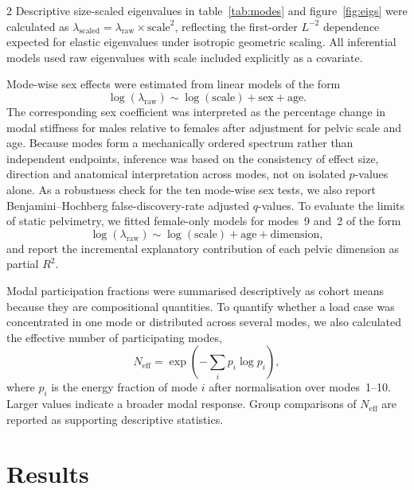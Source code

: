 \documentclass[openacc]{rsproca_new}
\begin{document}
\begin{multicols}{2}
Descriptive size-scaled eigenvalues in table~\ref{tab:modes} and figure~\ref{fig:eigs} were calculated as $\lambda_{\mathrm{scaled}}=\lambda_{\mathrm{raw}}\times \mathrm{scale}^{2}$, reflecting the first-order $L^{-2}$ dependence expected for elastic eigenvalues under isotropic geometric scaling. All inferential models used raw eigenvalues with scale included explicitly as a covariate.

Mode-wise sex effects were estimated from linear models of the form
\begin{equation}
\log(\lambda_{\mathrm{raw}}) \sim \log(\mathrm{scale}) + \mathrm{sex} + \mathrm{age}.
\end{equation}
The corresponding sex coefficient was interpreted as the percentage change in modal stiffness for males relative to females after adjustment for pelvic scale and age. Because modes form a mechanically ordered spectrum rather than independent endpoints, inference was based on the consistency of effect size, direction and anatomical interpretation across modes, not on isolated $p$-values alone. As a robustness check for the ten mode-wise sex tests, we also report Benjamini--Hochberg false-discovery-rate adjusted $q$-values. To evaluate the limits of static pelvimetry, we fitted female-only models for modes~9 and~2 of the form
\begin{equation}
\log(\lambda_{\mathrm{raw}}) \sim \log(\mathrm{scale}) + \mathrm{age} + \mathrm{dimension},
\end{equation}
and report the incremental explanatory contribution of each pelvic dimension as partial $R^2$.

Modal participation fractions were summarised descriptively as cohort means because they are compositional quantities. To quantify whether a load case was concentrated in one mode or distributed across several modes, we also calculated the effective number of participating modes,
\begin{equation}
N_{\mathrm{eff}} = \exp\left(-\sum_i p_i\log p_i\right),
\end{equation}
where $p_i$ is the energy fraction of mode $i$ after normalisation over modes~1--10. Larger values indicate a broader modal response. Group comparisons of $N_{\mathrm{eff}}$ are reported as supporting descriptive statistics.

\section{Results}

\end{multicols}
\end{document}
